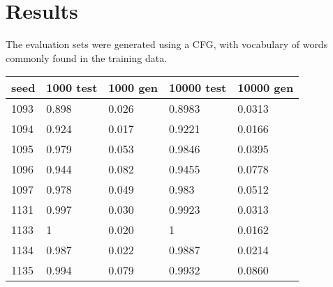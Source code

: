 \documentclass{article}
\begin{document}
\section{Results}

The evaluation sets were generated using a CFG, with vocabulary of words commonly found in the training data. 

\begin{table}[]
\begin{tabular}{@{}lllll@{}}
\toprule
seed   & 1000 test & 1000 gen & 10000 test & 10000 gen \\ \midrule
1093   & 0.898     & 0.026    & 0.8983     & 0.0313   \\
1094   & 0.924     & 0.017    & 0.9221     & 0.0166   \\  
1095   & 0.979     & 0.053    & 0.9846     & 0.0395   \\  
1096   & 0.944     & 0.082    & 0.9455     & 0.0778   \\  
1097   & 0.978     & 0.049    & 0.983      & 0.0512   \\  
1131   & 0.997     & 0.030    & 0.9923     & 0.0313   \\  
1133   & 1         & 0.020    & 1          & 0.0162   \\  
1134   & 0.987     & 0.022    & 0.9887     & 0.0214   \\  
1135   & 0.994     & 0.079    & 0.9932     & 0.0860   \\ \bottomrule
\end{tabular}
\label{tab:Table-3}
\end{table}
\end{document}
